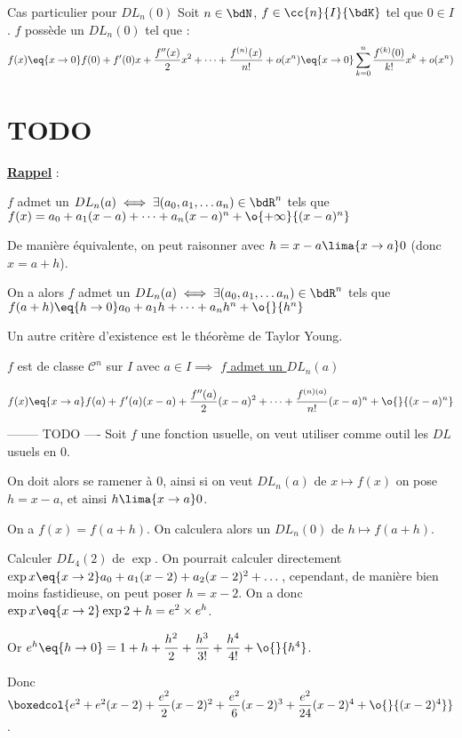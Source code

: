 \documentclass[a4paper,french,bookmarks]{article}
\begin{document}
\demo{
}

\begin{property}{Cas particulier pour $DL_n(0)$}{}
    Soit $n \in \bdN$, $f \in \cc{n}{I}{\bdK}$ tel que $0 \in I$. $f$ possède un $DL_n(0)$ tel que :
     \[ f(x) \eq{x \to 0} f(0) + f'(0)x + \dfrac{f''(x)}{2}x^2 + \dots + \dfrac{f^{(n)}(x)}{n!} + o(x^n) \eq{x \to 0} \sum_{k=0}^n \dfrac{f^{(k)}(0)}{k!}x^k + o(x^n)\]
\end{property}


\section*{TODO}

\underline{\textbf{Rappel}} :

$f$ admet un $DL_n(a) \iff \exists (a_0, a_1, \dots a_n) \in \bdR^n$ tels que $f(x) = a_0 + a_1(x-a) + \dots + a_n(x-a)^n + \o{+\infty}{(x-a)^n}$

De manière équivalente, on peut raisonner avec $h = x-a \lima{x \to a} 0$ (donc $x=a + h$).

On a alors $f$ admet un $DL_n(a) \iff \exists (a_0, a_1, \dots a_n) \in \bdR^n$ tels que $f(a+h) \eq{h \to 0} a_0 + a_1h+\dots+a_nh^n+\o{}{h^n}$

Un autre critère d'existence est le théorème de Taylor Young.

$f$ est de classe $\mathcal{C}^n$ sur $I$ avec $a \in I \implies$ \underline{$f$ admet un $DL_n(a)$}

\[f(x) \eq{x \to a} f(a) + f'(a)(x-a) + \dfrac{f''(a)}{2}(x-a)^2 + \dots + \dfrac{f^{(n)(a)}}{n!}(x-a)^n + \o{}{(x-a)^n}\]

-------- TODO ---- \newline
Soit $f$ une fonction usuelle, on veut utiliser comme outil les $DL$ usuels en $0$.

On doit alors se ramener à $0$, ainsi si on veut $DL_n(a)$ de $x \mapsto f(x)$ on pose $h = x - a$, et ainsi $h \lima{x \to a} 0$.

On a $f(x) = f(a+h)$. On calculera alors un $DL_n(0)$ de $h \mapsto f(a+h)$.

\begin{example}{}{}
    Calculer $DL_4(2)$ de $\exp$.
    \tcblower
    On pourrait calculer directement $\exp{x} \eq{x \to 2} a_0 + a_1(x-2) + a_2(x-2)^2 + \dots$, cependant, de manière bien moins fastidieuse, on peut poser $h = x - 2$. On a donc $\exp{x} \eq{x \to 2} \exp{2+h} = e^2\times e^h$.
    
    Or $e^h \eq{h \to 0} = 1 + h + \dfrac{h^2}{2} + \dfrac{h^3}{3!} + \dfrac{h^4}{4!}+\o{}{h^4}$.
    
    Donc $\boxedcol{e^2 + e^2(x-2) + \dfrac{e^2}{2}(x-2)^2 + \dfrac{e^2}{6}(x-2)^3 + \dfrac{e^2}{24}(x-2)^4 + \o{}{(x-2)^4}}$.
\end{example}
\end{document}
